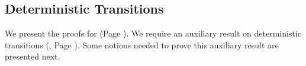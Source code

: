 \begin{comment}
			\item	$\trec{t}{  \btbra{l_1: \vart{t}, l_2: \tinact}  }$
					\[
					\tree{
					}{
						\es; \es; t_1: \btout{\tinact} \tinact \cat t_2: \btout{\tinact} \tinact \cat
						s: \btbra{l_1: \tinact, l_2: \tinact} \proves
						\mapchar{\btbra{l_1: \tinact, l_2: \tinact}}{s} = \bbra{s}{l_1: \bout{t_1}{s} \inact, l_2: \bout{t_2}{s} \inact}
						\hastype \Proc
					}
					\]
					and
					\[
					\tree{
						\begin{array}{l}
			\es; \es; t_1: \btout{\trec{t}{  \btbra{l_1: \vart{t}, l_2: \tinact}}} \tinact
		\cat s: \trec{t}{  \btbra{l_1: \vart{t}, l_2: \tinact}} \proves
					\bout{t_1}{s} \inact \hastype \Proc
							\\
		\es; \es; t_2: \btout{\tinact} \tinact \cat \tinact \proves
				\bout{t_2}{s} \inact \hastype \Proc
						\end{array}
					}{
						\es; \es; t_1: \btout{\trec{t}{  \btbra{l_1: \vart{t}, l_2: \tinact}}} \tinact \cat t_2: \btout{\tinact} \tinact \cat
						s: \trec{t}{  \btbra{l_1: \vart{t}, l_2: \tinact}} \proves
						\mapchar{\trec{t}{\btbra{l_1: \vart{t}, l_2: \tinact}}}{s} = \bbra{s}{l_1: \bout{t_1}{s} \inact, l_2: \bout{t_2}{s} \inact}
						\hastype \Proc
					}
					\]
		\end{itemize}
	\end{example}
}
\end{comment}



\subsection{Deterministic Transitions}
\label{app:sub_tau_inert}


We present the proofs for 
 (Page \pageref{the:coincidence}).
We require an auxiliary result on 
deterministic transitions (, Page \pageref{lem:up_to_deterministic_transition}).
Some notions needed to prove this auxiliary result are presented next.

